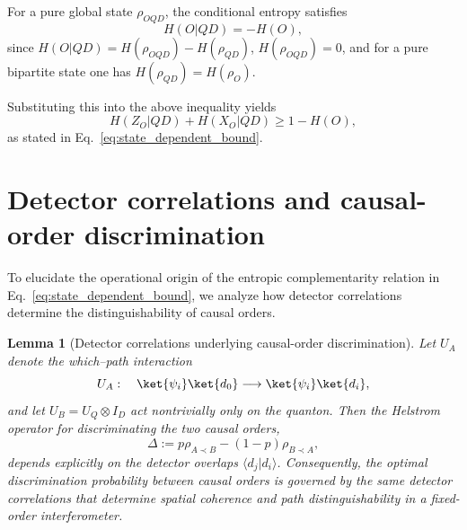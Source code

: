\documentclass[aps,pra,reprint,superscriptaddress]{revtex4-2}
\newtheorem{lemma}[theorem]{Lemma}
\begin{document}
For a pure global state $\rho_{OQD}$, the conditional entropy satisfies
\begin{equation}
H(O|QD) = -H(O),
\end{equation}
since $H(O|QD) = H(\rho_{OQD}) - H(\rho_{QD})$, $H(\rho_{OQD})=0$, and for a pure bipartite state one has $H(\rho_{QD}) = H(\rho_O)$.

Substituting this into the above inequality yields
\begin{equation}
H(Z_O|QD) + H(X_O|QD) \ge 1 - H(O),
\end{equation}
as stated in Eq.~\eqref{eq:state_dependent_bound}.

\section{Detector correlations and causal-order discrimination}
\label{app:causal_discrimination}

To elucidate the operational origin of the entropic complementarity relation in Eq.~\eqref{eq:state_dependent_bound}, we analyze how detector correlations determine the distinguishability of causal orders.

\begin{lemma}[Detector correlations underlying causal-order discrimination]
Let $U_A$ denote the which--path interaction
\begin{equation}
U_A:\quad \ket{\psi_i}\ket{d_0} \longrightarrow
\ket{\psi_i}\ket{d_i},
\end{equation}
and let $U_B = U_Q \otimes I_D$ act nontrivially only on the quanton. 
Then the Helstrom operator for discriminating the two causal orders,
\begin{equation}
\Delta := p\rho_{A\prec B}-(1-p)\rho_{B\prec A},
\end{equation}
depends explicitly on the detector overlaps $\langle d_j|d_i\rangle$. Consequently, the optimal discrimination probability between causal orders is governed by the same detector correlations that determine spatial coherence and path distinguishability in a fixed-order interferometer.
\end{lemma}
\end{document}
